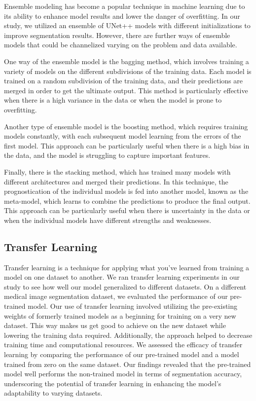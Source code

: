 \documentclass[conference]{IEEEtran}
\begin{document}
Ensemble modeling has become a popular technique in machine learning due to its ability to enhance model results and lower the danger of overfitting. In our study, we utilized an ensemble of UNet++ models with different initializations to improve segmentation results. However, there are further ways of ensemble models that could be channelized varying on the problem and data available.

One way of the ensemble model is the bagging method, which involves training a variety of models on the different subdivisions of the training data. Each model is trained on a random subdivision of the training data, and their predictions are merged in order to get  the ultimate output. This method is particularly effective when there is a high variance in the data or when the model is prone to overfitting.

Another type of ensemble model is the boosting method, which requires training models constantly, with each subsequent model learning from the errors of the first model. This approach can be particularly useful when there is a high bias in the data, and the model is struggling to capture important features.

Finally, there is the stacking method, which has trained many models with different architectures and merged their predictions. In this technique, the prognostication of the individual models is fed into another model, known as the meta-model, which learns to combine the predictions to produce the final output. This approach can be particularly useful when there is uncertainty in the data or when the individual models have different strengths and weaknesses.

\subsection{Transfer Learning}\label{SCM}
Transfer learning is a technique for applying what you've learned from training a model on one dataset to another. We ran transfer learning experiments in our study to see how well our model generalized to different datasets. On a different medical image segmentation dataset, we evaluated the performance of our pre-trained model.
Our use of transfer learning involved utilizing the pre-existing weights of formerly trained models as a beginning for training on a very new dataset. This way makes us get good to achieve on the new dataset while lowering the  training data required. Additionally, the approach helped to decrease training time and computational resources.
We assessed the efficacy of transfer learning by comparing the performance of our pre-trained model and a model trained from zero on the same dataset. Our findings revealed that the pre-trained model well performs the non-trained model in terms of segmentation accuracy, underscoring the potential of transfer learning in enhancing the model's adaptability to varying datasets.
\end{document}
